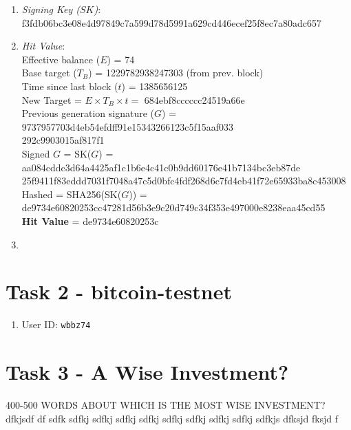 \documentclass[11pt]{article}
\begin{document}
\begin{enumerate}
\item \textit{Signing Key ($SK$)}: f3fdb06bc3e08e4d97849c7a599d78d5991a629cd446ecef25f8ec7a80adc657

\item \textit{Hit Value}:\\
Effective balance ($E$) = 74\\
Base target ($T_B$) = 1229782938247303 (from prev. block)\\
Time since last block ($t$) = 1385656125\\
New Target = $E\times T_B\times t=$ 684ebf8cccccc24519a66e\\
Previous generation signature ($G$) = 9737957703d4eb54efdff91e15343266123c5f15aaf033\\
292c9903015af817f1\\
Signed $G$ = SK($G$) = aa084cddc3d64a4425af1c1b6e4c41c0b9dd60176e41b7134bc3eb87de\\
25f9411f83eddd7031f7048a47c5d0bfc4fdf268d6c7fd4eb41f72e65933ba8c453008\\
Hashed = SHA256(SK($G$)) = de9734e60820253cc47281d56b3e9c20d749c34f353e497000e8238eaa45cd55\\
\textbf{Hit Value} = de9734e60820253c

\item 

\end{enumerate}

\section*{Task 2 - bitcoin-testnet}

\begin{enumerate}
\item User ID: \texttt{wbbz74}
\end{enumerate}

\section*{Task 3 - A Wise Investment?}


400-500 WORDS ABOUT WHICH IS THE MOST WISE INVESTMENT? dfkjsdf df sdfk sdfkj sdfkj sdfkj sdfkj sdfkj sdfkj sdfkj sdfkj sdfkjs dfksjd fksjd f
\end{document}
